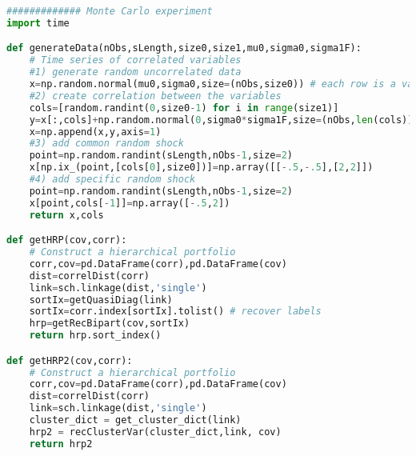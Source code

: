 \begin{lstlisting}[language=Python]
############# Monte Carlo experiment
import time

def generateData(nObs,sLength,size0,size1,mu0,sigma0,sigma1F):
    # Time series of correlated variables
    #1) generate random uncorrelated data
    x=np.random.normal(mu0,sigma0,size=(nObs,size0)) # each row is a variable 
    #2) create correlation between the variables
    cols=[random.randint(0,size0-1) for i in range(size1)]
    y=x[:,cols]+np.random.normal(0,sigma0*sigma1F,size=(nObs,len(cols)))
    x=np.append(x,y,axis=1)
    #3) add common random shock
    point=np.random.randint(sLength,nObs-1,size=2)
    x[np.ix_(point,[cols[0],size0])]=np.array([[-.5,-.5],[2,2]])
    #4) add specific random shock
    point=np.random.randint(sLength,nObs-1,size=2)
    x[point,cols[-1]]=np.array([-.5,2])
    return x,cols

def getHRP(cov,corr):
    # Construct a hierarchical portfolio
    corr,cov=pd.DataFrame(corr),pd.DataFrame(cov)
    dist=correlDist(corr)
    link=sch.linkage(dist,'single')
    sortIx=getQuasiDiag(link) 
    sortIx=corr.index[sortIx].tolist() # recover labels 
    hrp=getRecBipart(cov,sortIx)
    return hrp.sort_index()

def getHRP2(cov,corr):
    # Construct a hierarchical portfolio
    corr,cov=pd.DataFrame(corr),pd.DataFrame(cov)
    dist=correlDist(corr) 
    link=sch.linkage(dist,'single')
    cluster_dict = get_cluster_dict(link)
    hrp2 = recClusterVar(cluster_dict,link, cov)
    return hrp2



\end{lstlisting}
